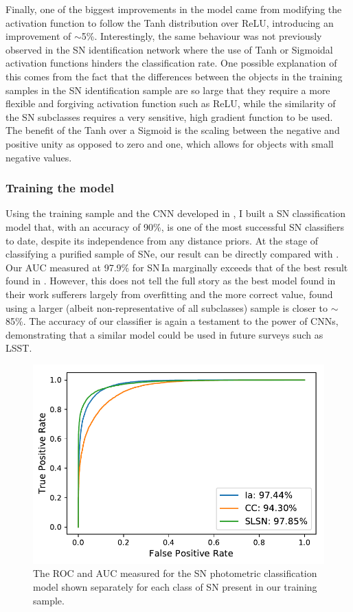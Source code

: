Finally, one of the biggest improvements in the model came from modifying the activation function to follow the Tanh distribution over ReLU, introducing an improvement of $\sim$5\%. Interestingly, the same behaviour was not previously observed in the SN identification network where the use of Tanh or Sigmoidal activation functions hinders the classification rate. One possible explanation of this comes from the fact that the differences between the objects in the training samples in the SN identification sample are so large that they require a more flexible and forgiving activation function such as ReLU, while the similarity of the SN subclasses requires a very sensitive, high gradient function to be used. The benefit of the Tanh over a Sigmoid is the scaling between the negative and positive unity as opposed to zero and one, which allows for objects with small negative values.

\subsubsection{Training the model} \label{sec:SNClassification}
Using the training sample and the CNN developed in , I built a SN classification model that, with an accuracy of 90\%, is one of the most successful SN classifiers to date, despite its independence from any distance priors. At the stage of classifying a purified sample of SNe, our result can be directly compared with \citet{Lochner2016}. Our AUC measured at 97.9\% for SN\,Ia marginally exceeds that of the best result found in \citet{Lochner2016}. However, this does not tell the full story as the best model found in their work sufferers largely from overfitting and the more correct value, found using a larger (albeit non-representative of all subclasses) sample is closer to $\sim$85\%. The accuracy of our classifier is again a testament to the power of CNNs, demonstrating that a similar model could be used in future surveys such as LSST.

\begin{figure}
  \includegraphics[width=\textwidth]{Figures/Chapter5/SNROC.pdf}
  \caption{The ROC and AUC measured for the SN photometric classification model shown separately for each class of SN present in our training sample.}
  \label{sec:SNClassificationROC}
\end{figure}

